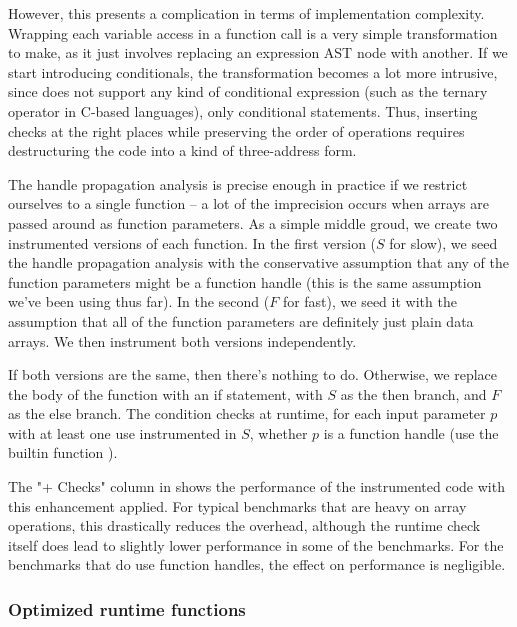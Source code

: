 However, this presents a complication in terms of implementation complexity.
Wrapping each variable access in a function call is a very simple
transformation to make, as it just involves replacing an expression AST node
with another. If we start introducing conditionals, the transformation becomes
a lot more intrusive, since \matlab does not support any kind of conditional
expression (such as the ternary \code{\?:} operator in C-based languages), only
conditional statements. Thus, inserting checks at the right places while
preserving the order of operations requires destructuring the code into a kind
of three-address form.

The handle propagation analysis is precise enough in practice if we restrict
ourselves to a single function -- a lot of the imprecision occurs when arrays
are passed around as function parameters. As a simple middle groud, we create
two instrumented versions of each function. In the first version ($S$ for
slow), we seed the handle propagation analysis with the conservative assumption
that any of the function parameters might be a function handle (this is the
same assumption we've been using thus far). In the second ($F$ for fast), we
seed it with the assumption that all of the function parameters are definitely
just plain data arrays. We then instrument both versions independently.

If both versions are the same, then there's nothing to do. Otherwise, we
replace the body of the function with an if statement, with $S$ as the then
branch, and $F$ as the else branch. The condition checks at runtime, for each
input parameter $p$ with at least one use instrumented in $S$, whether $p$
is a function handle (use the \matlab builtin function ).

The "+ Checks" column in  shows the
performance of the instrumented code with this enhancement applied. For typical
\matlab benchmarks that are heavy on array operations, this drastically reduces
the overhead, although the runtime check itself does lead to slightly lower
performance in some of the benchmarks. For the benchmarks that do use function
handles, the effect on performance is negligible.

\subsubsection{Optimized runtime functions}

